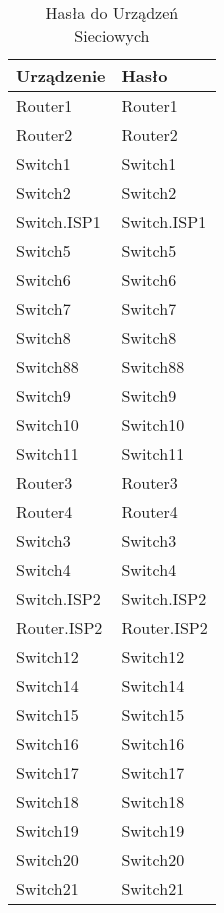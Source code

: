 \begin{table}[!ht]
    \centering
    \caption{Hasła do Urządzeń Sieciowych}
    \begin{tabular}{|l|l|}
        \hline
        \textbf{Urządzenie} & \textbf{Hasło} \\ \hline
        Router1 & Router1 \\ \hline
        Router2 & Router2 \\ \hline
        Switch1 & Switch1 \\ \hline
        Switch2 & Switch2 \\ \hline
        Switch.ISP1 & Switch.ISP1 \\ \hline
        Switch5 & Switch5 \\ \hline
        Switch6 & Switch6 \\ \hline
        Switch7 & Switch7 \\ \hline
        Switch8 & Switch8 \\ \hline
        Switch88 & Switch88 \\ \hline
        Switch9 & Switch9 \\ \hline
        Switch10 & Switch10 \\ \hline
        Switch11 & Switch11 \\ \hline
        Router3 & Router3 \\ \hline
        Router4 & Router4 \\ \hline
        Switch3 & Switch3 \\ \hline
        Switch4 & Switch4 \\ \hline
        Switch.ISP2 & Switch.ISP2 \\ \hline
        Router.ISP2 & Router.ISP2 \\ \hline
        Switch12 & Switch12 \\ \hline
        Switch14 & Switch14 \\ \hline
        Switch15 & Switch15 \\ \hline
        Switch16 & Switch16 \\ \hline
        Switch17 & Switch17 \\ \hline
        Switch18 & Switch18 \\ \hline
        Switch19 & Switch19 \\ \hline
        Switch20 & Switch20 \\ \hline
        Switch21 & Switch21 \\ \hline
    \end{tabular}
\end{table}

